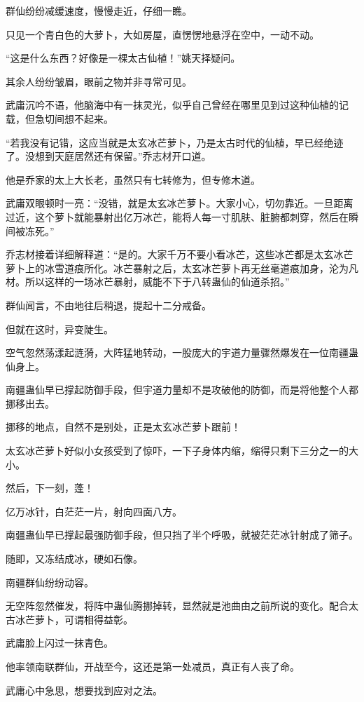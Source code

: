 \begin{this_body}
群仙纷纷减缓速度，慢慢走近，仔细一瞧。

只见一个青白色的大萝卜，大如房屋，直愣愣地悬浮在空中，一动不动。

“这是什么东西？好像是一棵太古仙植！”姚天择疑问。

其余人纷纷皱眉，眼前之物并非寻常可见。

武庸沉吟不语，他脑海中有一抹灵光，似乎自己曾经在哪里见到过这种仙植的记载，但急切间想不起来。

“若我没有记错，这应当就是太玄冰芒萝卜，乃是太古时代的仙植，早已经绝迹了。没想到天庭居然还有保留。”乔志材开口道。

他是乔家的太上大长老，虽然只有七转修为，但专修木道。

武庸双眼顿时一亮：“没错，就是太玄冰芒萝卜。大家小心，切勿靠近。一旦距离过近，这个萝卜就能暴射出亿万冰芒，能将人每一寸肌肤、脏腑都刺穿，然后在瞬间被冻死。”

乔志材接着详细解释道：“是的。大家千万不要小看冰芒，这些冰芒都是太玄冰芒萝卜上的冰雪道痕所化。冰芒暴射之后，太玄冰芒萝卜再无丝毫道痕加身，沦为凡材。所以这样的一场冰芒暴射，威能不下于八转蛊仙的仙道杀招。”

群仙闻言，不由地往后稍退，提起十二分戒备。

但就在这时，异变陡生。

空气忽然荡漾起涟漪，大阵猛地转动，一股庞大的宇道力量骤然爆发在一位南疆蛊仙身上。

南疆蛊仙早已撑起防御手段，但宇道力量却不是攻破他的防御，而是将他整个人都挪移出去。

挪移的地点，自然不是别处，正是太玄冰芒萝卜跟前！

太玄冰芒萝卜好似小女孩受到了惊吓，一下子身体内缩，缩得只剩下三分之一的大小。

然后，下一刻，蓬！

亿万冰针，白茫茫一片，射向四面八方。

南疆蛊仙早已撑起最强防御手段，但只挡了半个呼吸，就被茫茫冰针射成了筛子。

随即，又冻结成冰，硬如石像。

南疆群仙纷纷动容。

无空阵忽然催发，将阵中蛊仙腾挪掉转，显然就是池曲由之前所说的变化。配合太古冰芒萝卜，可谓相得益彰。

武庸脸上闪过一抹青色。

他率领南联群仙，开战至今，这还是第一处减员，真正有人丧了命。

武庸心中急思，想要找到应对之法。


\end{this_body}
